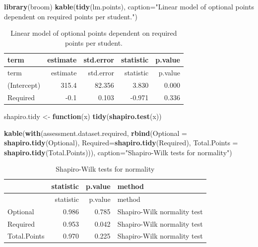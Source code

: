 \documentclass[]{article}
\newenvironment{Shaded}{\begin{snugshade}}{\end{snugshade}}
\newcommand{\KeywordTok}[1]{\textcolor[rgb]{0.13,0.29,0.53}{\textbf{#1}}}
\newcommand{\DataTypeTok}[1]{\textcolor[rgb]{0.13,0.29,0.53}{#1}}
\newcommand{\StringTok}[1]{\textcolor[rgb]{0.31,0.60,0.02}{#1}}
\newcommand{\ControlFlowTok}[1]{\textcolor[rgb]{0.13,0.29,0.53}{\textbf{#1}}}
\newcommand{\NormalTok}[1]{#1}
\begin{document}
\begin{Shaded}
\begin{Highlighting}[]
\KeywordTok{library}\NormalTok{(broom)}
\KeywordTok{kable}\NormalTok{(}\KeywordTok{tidy}\NormalTok{(lm.points), }\DataTypeTok{caption=}\StringTok{"Linear model of optional points dependent on required points per student."}\NormalTok{)}
\end{Highlighting}
\end{Shaded}

\begin{longtable}[]{@{}lrrrr@{}}
\caption{Linear model of optional points dependent on required points
per student.}\tabularnewline
\toprule
term & estimate & std.error & statistic & p.value\tabularnewline
\midrule
\endfirsthead
\toprule
term & estimate & std.error & statistic & p.value\tabularnewline
\midrule
\endhead
(Intercept) & 315.4 & 82.356 & 3.830 & 0.000\tabularnewline
Required & -0.1 & 0.103 & -0.971 & 0.336\tabularnewline
\bottomrule
\end{longtable}

\begin{Shaded}
\begin{Highlighting}[]
\NormalTok{shapiro.tidy <-}\StringTok{ }\ControlFlowTok{function}\NormalTok{(x) }\KeywordTok{tidy}\NormalTok{(}\KeywordTok{shapiro.test}\NormalTok{(x))}

\KeywordTok{kable}\NormalTok{(}\KeywordTok{with}\NormalTok{(assessment.dataset.required, }\KeywordTok{rbind}\NormalTok{(}\DataTypeTok{Optional =} \KeywordTok{shapiro.tidy}\NormalTok{(Optional), }
                                              \DataTypeTok{Required=}\KeywordTok{shapiro.tidy}\NormalTok{(Required),}
                                              \DataTypeTok{Total.Points =} \KeywordTok{shapiro.tidy}\NormalTok{(Total.Points))), }\DataTypeTok{caption=}\StringTok{"Shapiro-Wilk tests for normality"}\NormalTok{)}
\end{Highlighting}
\end{Shaded}

\begin{longtable}[]{@{}lrrl@{}}
\caption{Shapiro-Wilk tests for normality}\tabularnewline
\toprule
& statistic & p.value & method\tabularnewline
\midrule
\endfirsthead
\toprule
& statistic & p.value & method\tabularnewline
\midrule
\endhead
Optional & 0.986 & 0.785 & Shapiro-Wilk normality test\tabularnewline
Required & 0.953 & 0.042 & Shapiro-Wilk normality test\tabularnewline
Total.Points & 0.970 & 0.225 & Shapiro-Wilk normality
test\tabularnewline
\bottomrule
\end{longtable}
\end{document}
